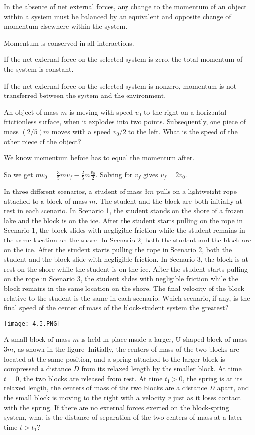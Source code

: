 \documentclass[../mech.tex]{subfiles}
\begin{document}
In the absence of net external forces, any change to the momentum of an object within a system must be balanced by an equivalent and opposite change of momentum elsewhere within the system.

Momentum is conserved in all interactions.

If the net external force on the selected system is zero, the total momentum of the system is constant.

If the net external force on the selected system is nonzero, momentum is not transferred between the system and the environment.

\pagebreak
\begin{example}
    An object of mass $m$ is moving with speed $v_0$ to the right on a horizontal frictionless surface, when it explodes into two points. Subsequently, one piece of mass $(2/5)m$ moves with a speed $v_0/2$ to the left. What is the speed of the other piece of the object?

    We know momentum before has to equal the momentum after.

    So we get $mv_0=\frac{3}{5}mv_f-\frac{2}{5}m\frac{v_0}{2}$. Solving for $v_f$ gives $v_f=2v_0$.
\end{example}

\ex In three different scenarios, a student of mass $3m$ pulls on a lightweight rope attached to a block of mass $m$. The student and the block are both initially at rest in each scenario.
In Scenario 1, the student stands on the shore of a frozen lake and the block is on the ice. After the student starts pulling on the rope in Scenario 1, the block slides with negligible friction while the student remains in the same location on the shore.
In Scenario 2, both the student and the block are on the ice. After the student starts pulling the rope in Scenario 2, both the student and the block slide with negligible friction. In Scenario 3, the block is at rest on the shore while the student is on the ice.
After the student starts pulling on the rope in Scenario 3, the student slides with negligible friction while the block remains in the same location on the shore. The final velocity of the block relative to the student is the same in each scenario.
Which scenario, if any, is the final speed of the center of mass of the block-student system the greatest?

\ex \begin{center}
    \texttt{[image: 4.3.PNG]}
\end{center}
A small block of mass $m$ is held in place inside a larger, U-shaped block of mass $3m$, as shown in the figure. Initially, the centers of mass of the two blocks are located at the same position, and a spring 
attached to the larger block is compressed a distance $D$ from its relaxed length by the smaller block. At time $t=0$, the two blocks are released from rest. At time $t_1>0$, the spring is at its relaxed length, the centers of mass of the two blocks are a distance $D$ apart, and the small block is moving 
to the right with a velocity $v$ just as it loses contact with the spring. If there are no external forces exerted on the block-spring system, what is the distance of separation of the two centers of mass at a later time $t>t_1$?
\end{document}
